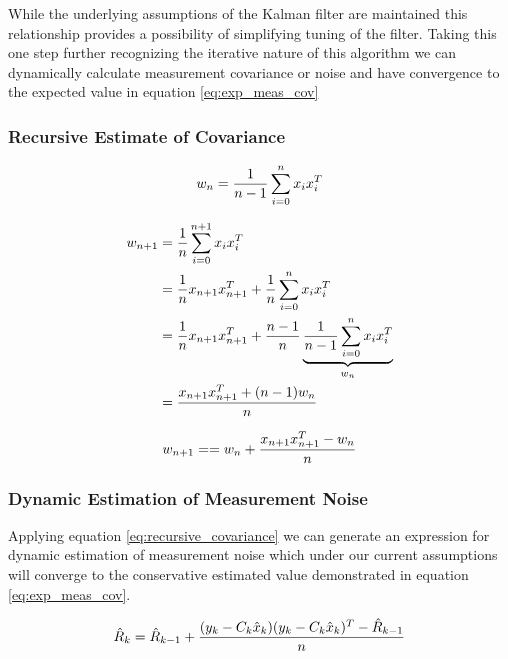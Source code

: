 \documentclass[a4paper]{article}
\begin{document}
	While the underlying assumptions of the Kalman filter are maintained this relationship provides a possibility of simplifying tuning of the filter. Taking this one step further recognizing the iterative nature of this algorithm we can dynamically calculate measurement covariance or noise and have convergence to the expected value in equation \ref{eq:exp_meas_cov}

	\subsubsection{Recursive Estimate of Covariance}

	\begin{equation}
		w_n = {1 \over n - 1} \displaystyle\sum_{i=0} ^{n} x_ix_i^T\\
	\end{equation}

	\begin{align*}
		w_{n+1} &= {1 \over n} \displaystyle\sum_{i=0} ^{n+1} x_ix_i^T\\
		&= {1 \over n} x_{n+1}x_{n+1}^T + {1 \over n} \displaystyle\sum_{i=0} ^{n} x_ix_i^T\\
		&= {1 \over n} x_{n+1}x_{n+1}^T + {n-1 \over n} \underbrace{{1 \over n -1} \displaystyle\sum_{i=0} ^{n} x_ix_i^T}_{w_n}\\
		&= {x_{n+1}x_{n+1}^T + (n - 1) w_n \over n}\\
	\end{align*}

	\begin{equation}
		w_{n+1} = = w_n + {x_{n+1}x_{n+1}^T -w_n \over n}
		\label{eq:recursive_covariance}
	\end{equation}

	\subsubsection{Dynamic Estimation of Measurement Noise}

	Applying equation \ref{eq:recursive_covariance} we can generate an expression for dynamic estimation of measurement noise which under our current assumptions will converge to the conservative estimated value demonstrated in equation \ref{eq:exp_meas_cov}.


	\begin{equation}
		\hat{R}_k = \hat{R}_{k-1} + {(y_k - C_k \hat{x}_k)(y_k - C_k \hat{x}_k)^T - \hat{R}_{k-1} \over n}
	\end{equation}
\end{document}
